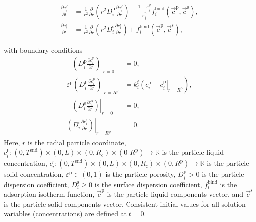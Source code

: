 \documentclass{article}
\begin{document}
\begin{align}
\frac{\partial c^{\mathrm{p}}_{i}}{\partial t} &= \frac{1}{r^2} \frac{\partial }{\partial r} \left( r^2 D_{i}^{\mathrm{p}} \frac{\partial c^{\mathrm{p}}_{i}}{\partial r} \right) - \frac{1 - \varepsilon^{\mathrm{p}}_{j}}{\varepsilon^{\mathrm{p}}_{j}}f^{\mathrm{bind}}_{i}\left( \vec{c}^{\mathrm{p}}, \vec{c}^{\mathrm{s}} \right) , \\
\frac{\partial c^{\mathrm{s}}_{i}}{\partial t} &=  \frac{1}{r^2} \frac{\partial }{\partial r} \left( r^2 D_{i}^{\mathrm{s}} \frac{\partial c^{\mathrm{s}}_{i}}{\partial r} \right)  + f^{\mathrm{bind}}_{i}\left( \vec{c}^{\mathrm{p}}, \vec{c}^{\mathrm{s}} \right) ,
\end{align}

with boundary conditions
\begin{align}
- \left. \left( D^{\mathrm{p}}_{i} \frac{\partial c^{\mathrm{p}}_{i}}{\partial r} \right) \right|_{r=0}
&= 0, \\
\varepsilon^{\mathrm{p}} \left. \left( D^{\mathrm{p}}_{i} \frac{\partial c^{\mathrm{p}}_{i}}{\partial r} \right)\right|_{r = R^{\mathrm{p}}_{}}
               &= k^{\mathrm{f}}_{i} \left. \left( c^{\mathrm{b}}_i - c^{\mathrm{p}}_{i} \right|_{r = R^{\mathrm{p}}_{}} \right),\\
-\left( \left. D^{\mathrm{s}}_{i} \frac{\partial c^{\mathrm{s}}_{i}}{\partial r} \right) \right|_{r=0}
&= 0, \\
\left( \left. D^{\mathrm{s}}_{i} \frac{\partial c^{\mathrm{s}}_{i}}{\partial r} \right) \right|_{r = R^{\mathrm{p}}_{}}
&= 0.
\end{align}
Here, $r$ is the radial particle coordinate, $c^{\mathrm{p}}_{i}\colon  (0, T^\mathrm{end}) \times (0, L)\times (0, R_\mathrm{c})\times (0, R^{\mathrm{p}}) \mapsto \mathbb{R}$ is the particle liquid concentration, $c^{\mathrm{s}}_{i}\colon  (0, T^\mathrm{end}) \times (0, L)\times (0, R_\mathrm{c})\times (0, R^{\mathrm{p}}) \mapsto \mathbb{R}$ is the particle solid concentration, $\varepsilon^{\mathrm{p}}\in (0, 1)$ is the particle porosity, $D^\mathrm{p}_{i}> 0$ is the particle dispersion coefficient, $D^\mathrm{s}_{i}\geq 0$ is the surface dispersion coefficient, $f^\mathrm{bind}_{i}$ is the adsorption isotherm function, $\vec{c}^\mathrm{p}$ is the particle liquid components vector, and $\vec{c}^\mathrm{s}$ is the particle solid components vector.
Consistent initial values for all solution variables (concentrations) are defined at $t = 0$.
\end{document}
